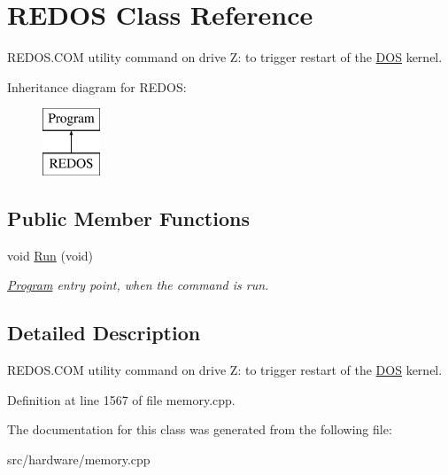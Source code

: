 \hypertarget{classREDOS}{\section{R\-E\-D\-O\-S Class Reference}
\label{classREDOS}
}


R\-E\-D\-O\-S.\-C\-O\-M utility command on drive Z\-: to trigger restart of the \hyperlink{classDOS}{D\-O\-S} kernel.  


Inheritance diagram for R\-E\-D\-O\-S\-:\begin{figure}[H]
\begin{center}
\leavevmode
\includegraphics[height=2.000000cm]{classREDOS}
\end{center}
\end{figure}
\subsection*{Public Member Functions}
\begin{DoxyCompactItemize}
\item 
\hypertarget{classREDOS_aa2d659599de1058d1b59069bfad7da76}{void \hyperlink{classREDOS_aa2d659599de1058d1b59069bfad7da76}{Run} (void)}\label{classREDOS_aa2d659599de1058d1b59069bfad7da76}

\begin{DoxyCompactList}\small\item\em \hyperlink{classProgram}{Program} entry point, when the command is run. \end{DoxyCompactList}\end{DoxyCompactItemize}


\subsection{Detailed Description}
R\-E\-D\-O\-S.\-C\-O\-M utility command on drive Z\-: to trigger restart of the \hyperlink{classDOS}{D\-O\-S} kernel. 

Definition at line 1567 of file memory.\-cpp.



The documentation for this class was generated from the following file\-:\begin{DoxyCompactItemize}
\item 
src/hardware/memory.\-cpp\end{DoxyCompactItemize}
